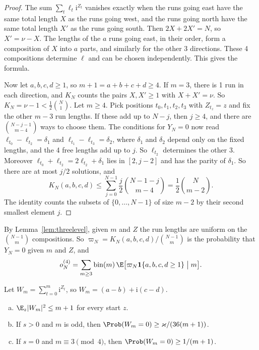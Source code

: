 \begin{proof}
The sum $\sum_t\ell_t\mathrm i^{Z_t}$ vanishes exactly when the runs going east have the same total
length $X$ as the runs going west, and the runs going north have the same total length $X'$ as the
runs going south. Then $2X+2X'=N$, so $X'=\nu-X$. The lengths of the $a$ runs going east, in their
order, form a composition of $X$ into $a$ parts, and similarly for the other 3 directions. These 4
compositions determine $\ell$ and can be chosen independently. This gives the formula.

Now let $a,b,c,d\ge1$, so $m+1=a+b+c+d\ge4$. If $m=3$, there is 1 run in each direction, and
$K_N$ counts the pairs $X,X'\ge1$ with $X+X'=\nu$. So $K_N=\nu-1<\frac12\binom N1$. Let $m\ge4$.
Pick positions $t_0,t_1,t_2,t_3$ with $Z_{t_z}=z$ and fix the other $m-3$ run lengths. If these add
up to $N-j$, then $j\ge4$, and there are $\binom{N-j-1}{m-4}$ ways to choose them. The conditions
for $Y_N=0$ now read $\ell_{t_0}-\ell_{t_2}=\delta_1$ and $\ell_{t_1}-\ell_{t_3}=\delta_2$, where
$\delta_1$ and $\delta_2$ depend only on the fixed lengths, and the 4 free lengths add up to $j$. So
$\ell_{t_2}$ determines the other 3. Moreover $\ell_{t_0}+\ell_{t_2}=2\ell_{t_2}+\delta_1$ lies in
$[2,j-2]$ and has the parity of $\delta_1$. So there are at most $j/2$ solutions, and
\[
 K_N(a,b,c,d)\le\sum_{j=0}^{N-1}\frac j2\binom{N-1-j}{m-4}=\frac12\binom N{m-2}.
\]
The identity counts the subsets of $\{0,\dots,N-1\}$ of size $m-2$ by their second smallest element
$j$.
\end{proof}

By Lemma~\ref{lem:threelevel}, given $m$ and $Z$ the run lengths are uniform on the $\binom{N-1}m$
compositions. So $\varpi_N=K_N(a,b,c,d)/\binom{N-1}m$ is the probability that $Y_N=0$ given $m$
and $Z$, and
\begin{equation}\label{eq:app-planar-o4}
 o^{(4)}_N=\sum_{m\ge3}\mathrm{bin}(m)\,\E\bigl[\varpi_N\mathbf 1\{a,b,c,d\ge1\}\bigm|m\bigr].
\end{equation}

\begin{lemma}\label{lem:skelreturn}
Let $W_m=\sum_{t=0}^m\mathrm i^{Z_t}$, so $W_m=(a-b)+\mathrm i(c-d)$.
\begin{enumerate}[(a)]
\item $\E_z\lvert W_m\rvert^2\le m+1$ for every start $z$.
\item If $s>0$ and $m$ is odd, then $\Prob(W_m=0)\ge\varkappa/(36(m+1))$.
\item If $s=0$ and $m\equiv3\pmod4$, then $\Prob(W_m=0)\ge1/(m+1)$.
\end{enumerate}
\end{lemma}

